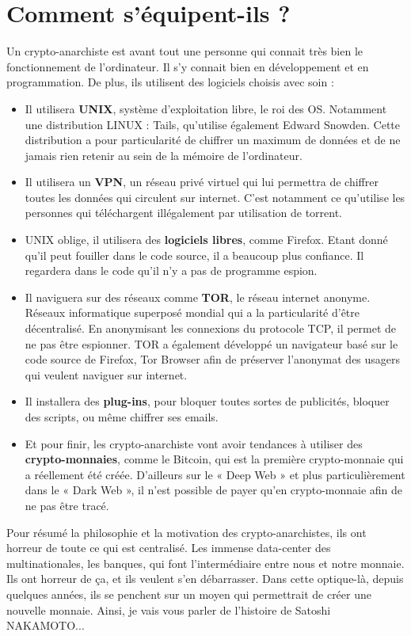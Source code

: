 \documentclass{bredele} %
\begin{document}
    \section*{Comment s'équipent-ils ?}
    Un crypto-anarchiste est avant tout une personne qui connait très bien le fonctionnement de l’ordinateur. Il s’y connait bien en développement et en programmation. De plus, ils utilisent des logiciels choisis avec soin :
    \begin{itemize}
        \item Il utilisera \textbf{UNIX}, système d’exploitation libre, le roi des OS. Notamment une distribution LINUX : Tails, qu’utilise également Edward Snowden. Cette distribution a pour particularité de chiffrer un maximum de données et de ne jamais rien retenir au sein de la mémoire de l’ordinateur.
        \item Il utilisera un \textbf{VPN}, un réseau privé virtuel qui lui permettra de chiffrer toutes les données qui circulent sur internet. C’est notamment ce qu’utilise les personnes qui téléchargent illégalement par utilisation de torrent.
        \item UNIX oblige, il utilisera des \textbf{logiciels libres}, comme Firefox. Etant donné qu’il peut fouiller dans le code source, il a beaucoup plus confiance. Il regardera dans le code qu’il n’y a pas de programme espion.
        \item Il naviguera sur des réseaux comme \textbf{TOR}, le réseau internet anonyme. Réseaux informatique superposé mondial qui a la particularité d’être décentralisé. En anonymisant les connexions du protocole TCP, il permet de ne pas être espionner. TOR a également développé un navigateur basé sur le code source de Firefox, Tor Browser afin de préserver l’anonymat des usagers qui veulent naviguer sur internet.
        \item Il installera des \textbf{plug-ins}, pour bloquer toutes sortes de publicités, bloquer des scripts, ou même chiffrer ses emails.
        \item Et pour finir, les crypto-anarchiste vont avoir tendances à utiliser des \textbf{crypto-monnaies}, comme le Bitcoin, qui est la première crypto-monnaie qui a réellement été créée. D’ailleurs sur le « Deep Web » et plus particulièrement dans le « Dark Web », il n’est possible de payer qu’en crypto-monnaie afin de ne pas être tracé.
    \end{itemize}
    Pour résumé la philosophie et la motivation des crypto-anarchistes, ils ont horreur de toute ce qui est centralisé. Les immense data-center des multinationales, les banques, qui font l’intermédiaire entre nous et notre monnaie. Ils ont horreur de ça, et ils veulent s’en débarrasser. Dans cette optique-là, depuis quelques années, ils se penchent sur un moyen qui permettrait de créer une nouvelle monnaie.
    Ainsi, je vais vous parler de l’histoire de Satoshi NAKAMOTO...
\end{document}
